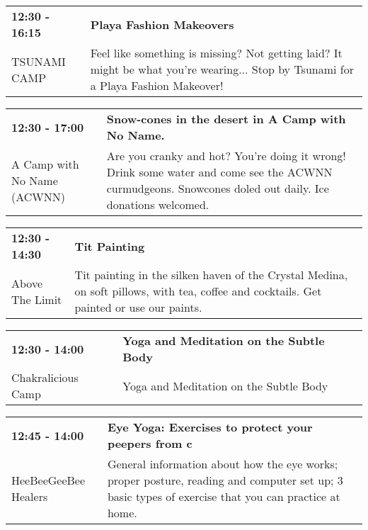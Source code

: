 \begin{tabular}{ p{1in} p{2.2in} }
    \textbf{12:30 - 16:15} & \textbf{Playa Fashion Makeovers} \\
    TSUNAMI CAMP \newline  & Feel like something is missing?  Not getting laid?  It might be what you're wearing...  Stop by Tsunami for a Playa Fashion Makeover! \\
    \hline 
\end{tabular}
    
\begin{tabular}{ p{1in} p{2.2in} }
    \textbf{12:30 - 17:00} & \textbf{Snow-cones in the desert in A Camp with No Name.} \\
    A Camp with No Name (ACWNN) \newline  & Are you cranky and hot? You're doing it wrong! Drink some water and come see the ACWNN curmudgeons. Snowcones doled out daily. Ice donations welcomed. \\
    \hline 
\end{tabular}
    
\begin{tabular}{ p{1in} p{2.2in} }
    \textbf{12:30 - 14:30} & \textbf{Tit Painting} \\
    Above The Limit \newline  & Tit painting in the silken haven of the Crystal Medina, on soft pillows, with tea, coffee and cocktails. Get painted or use our paints. \\
    \hline 
\end{tabular}
    
\begin{tabular}{ p{1in} p{2.2in} }
    \textbf{12:30 - 14:00} & \textbf{Yoga and Meditation on the Subtle Body} \\
    Chakralicious Camp \newline  & Yoga and Meditation on the Subtle Body \\
    \hline 
\end{tabular}
    
\begin{tabular}{ p{1in} p{2.2in} }
    \textbf{12:45 - 14:00} & \textbf{Eye Yoga: Exercises to protect your peepers from c} \\
    HeeBeeGeeBee Healers \newline  & General information about how the eye works; proper posture, reading and computer set up; 3 basic types of exercise that you can practice at home. \\
    \hline 
\end{tabular}
    

